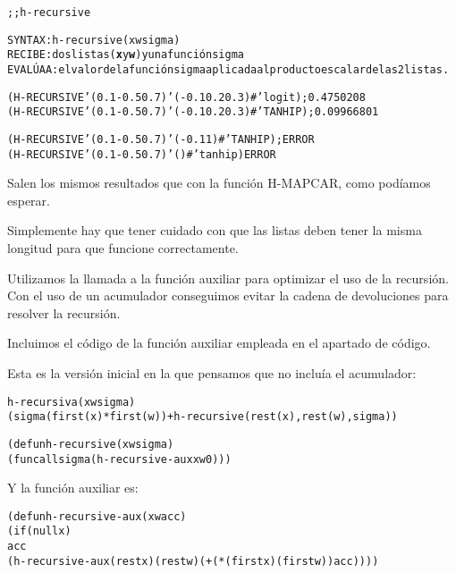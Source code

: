 \begin{aibox}{\function}
\begin{alltt}
;; h-recursive

SYNTAX: h-recursive (x w sigma) 
RECIBE: dos listas (\textbf{x} y \textbf{w}) y una función sigma
EVALÚA A: el valor de la función sigma aplicada al producto escalar de las 2 listas.
\end{alltt}
\end{aibox}

\begin{aibox}{\examples}
\begin{alltt}
(H-RECURSIVE '(0.1 -0.5 0.7) '(-0.1 0.2 0.3) #'logit); 0.4750208
(H-RECURSIVE '(0.1 -0.5 0.7) '(-0.1 0.2 0.3) #'TANHIP); 0.09966801

(H-RECURSIVE '(0.1 -0.5 0.7) '(-0.1 1) #'TANHIP); ERROR
(H-RECURSIVE '(0.1 -0.5 0.7) '() #'tanhip) ERROR
\end{alltt}
\end{aibox}

\begin{aibox}{\comments}
Salen los mismos resultados que con la función H-MAPCAR, como podíamos esperar. 

Simplemente hay que tener cuidado con que las listas deben tener la misma longitud para que funcione correctamente.

Utilizamos la llamada a la función auxiliar para optimizar el uso de la recursión. Con el uso de un acumulador conseguimos evitar la cadena de devoluciones para resolver la recursión.

Incluimos el código de la función auxiliar empleada en el apartado de código.
\end{aibox}

\begin{aibox}{\pseudocode}
Esta es la versión inicial en la que pensamos que no incluía el acumulador: 
\begin{alltt}
h-recursiva (x w sigma)
     (sigma(first(x)*first(w)) + h-recursive(rest(x),rest(w),sigma))
\end{alltt}
\end{aibox}
\begin{aibox}{\code}

\begin{alltt}

(defun h-recursive (x w sigma) 
        (funcall sigma (h-recursive-aux x w 0)))

\end{alltt}
Y la función auxiliar es:
\begin{alltt}
(defun h-recursive-aux (x w acc)
    (if (null x)
          acc
    (h-recursive-aux (rest x) (rest w) ( + (* (first x)  (first w)) acc))))


\end{alltt}
\end{aibox}
